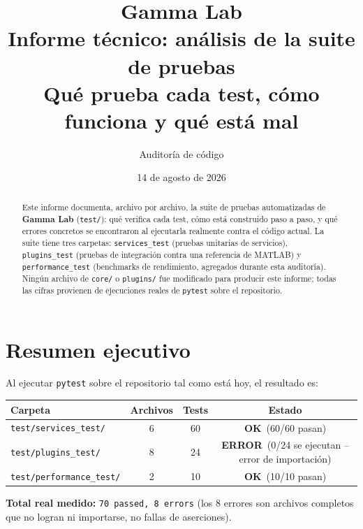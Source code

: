 \documentclass[11pt,a4paper]{article}
\title{\textbf{Gamma Lab}\\[4pt]\large Informe técnico: análisis de la suite de pruebas\\
\large Qué prueba cada test, cómo funciona y qué está mal}
\author{Auditoría de código}
\date{14 de agosto de 2026}
\newcommand{\okmark}{\textcolor{ok}{\textbf{OK}}}
\newcommand{\errmark}{\textcolor{critico}{\textbf{ERROR}}}
\begin{document}
\maketitle
\thispagestyle{empty}

\begin{abstract}
\noindent
Este informe documenta, archivo por archivo, la suite de pruebas automatizadas de \textbf{Gamma Lab}
(\texttt{test/}): qué verifica cada test, cómo está construido paso a paso, y qué errores concretos se
encontraron al ejecutarla realmente contra el código actual. La suite tiene tres carpetas:
\texttt{services\_\allowbreak test} (pruebas unitarias de servicios), \texttt{plugins\_\allowbreak test} (pruebas de integración
contra una referencia de MATLAB) y \texttt{performance\_\allowbreak test} (benchmarks de rendimiento, agregados durante
esta auditoría). Ningún archivo de \texttt{core/} o \texttt{plugins/} fue modificado para producir este
informe; todas las cifras provienen de ejecuciones reales de \texttt{pytest} sobre el repositorio.
\end{abstract}

\tableofcontents
\newpage

\section{Resumen ejecutivo}

Al ejecutar \texttt{pytest} sobre el repositorio tal como está hoy, el resultado es:

\begin{center}
\begin{tabular}{lccc}
\toprule
\textbf{Carpeta} & \textbf{Archivos} & \textbf{Tests} & \textbf{Estado} \\
\midrule
\texttt{test/services\_\allowbreak test/} & 6 & 60 & \okmark\ (60/60 pasan) \\
\texttt{test/plugins\_\allowbreak test/}  & 8 & 24 & \errmark\ (0/24 se ejecutan -- error de importación) \\
\texttt{test/performance\_\allowbreak test/} & 2 & 10 & \okmark\ (10/10 pasan) \\
\bottomrule
\end{tabular}
\end{center}

\noindent\textbf{Total real medido:} \texttt{70 passed, 8 errors} (los 8 errores son archivos completos que
no logran ni importarse, no fallas de aserciones).
\end{document}
